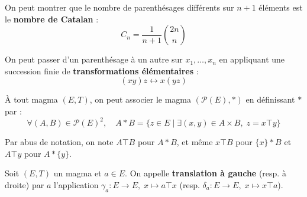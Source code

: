 \documentclass[a4paper,11pt]{article}
\newcommand{\mot}[1]{\textcolor{bordeaux}{\textbf{#1}}}
\begin{document}
\begin{center}
\end{center}

On peut montrer que le nombre de parenthésages différents sur $n+1$ éléments est le \mot{nombre de Catalan} :
\[
C_n = \frac{1}{n+1}\binom{2n}{n}
\]

On peut passer d'un parenthésage à un autre sur $x_1, \dots, x_n$ en appliquant une succession finie de \mot{transformations élémentaires} :
\[
(xy)z \longleftrightarrow x(yz)
\]

\begin{proposition}
À tout magma $(E, T)$, on peut associer le magma $(\mathcal{P}(E), \ast)$ en définissant $\ast$ par :
\[
\forall (A, B) \in \mathcal{P}(E)^2, \quad A \ast B = \{ z \in E \mid \exists (x,y) \in A \times B, \; z = x \top y \}
\]
\end{proposition}

\begin{remarque}
Par abus de notation, on note $A \top B$ pour $A \ast B$, et même $x \top B$ pour $\{x\} \ast B$ et $A \top y$ pour $A \ast \{y\}$.
\end{remarque}

\begin{definition}
Soit $(E, T)$ un magma et $a \in E$. On appelle \mot{translation à gauche} (resp. à droite) par $a$ l'application $\gamma_a : E \to E, \; x \mapsto a \top x$ (resp. $\delta_a : E \to E, \; x \mapsto x \top a$).
\end{definition}
\end{document}
